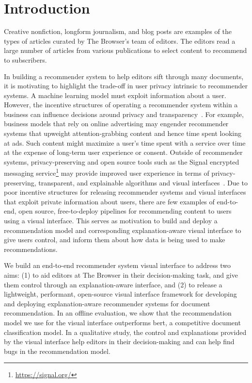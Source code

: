 \section{Introduction}
\label{sec:introduction}
Creative nonfiction, longform journalism, and blog posts are examples of the types of articles curated by The Browser's team of editors. The editors read a large number of articles from various publications to select content to recommend to subscribers.

In building a recommender system to help editors sift through many documents, it is motivating to highlight the trade-off in user privacy intrinsic to recommender systems. A machine learning model must exploit information about a user. However, the incentive structures of operating a recommender system within a business can influence decisions around privacy and transparency~\citep{diakopoulos2020oxford}. For example, business models that rely on online advertising may engender recommender systems that upweight attention-grabbing content and hence time spent looking at ads. Such content might maximize a user's time spent with a service over time at the expense of long-term user experience or consent. Outside of recommender systems, privacy-preserving and open source tools such as the Signal encrypted messaging service\footnote{\url{https://signal.org/}} may provide improved user experience in terms of privacy-preserving, transparent, and explainable algorithms and visual interfaces~\citep{cohn-gordon2017a-formal}. Due to poor incentive structures for releasing recommender systems and visual interfaces that exploit private information about users, there are few examples of end-to-end, open source, free-to-deploy pipelines for recommending content to users using a visual interface. This serves as motivation to build and deploy a recommendation model and corresponding explanation-aware visual interface to give users control, and inform them about how data is being used to make recommendations.

We build an end-to-end recommender system visual interface to address two aims: (1) to aid editors at The Browser in their decision-making task, and give them control through an explanation-aware interface, and (2) to release a lightweight, performant, open-source visual interface framework for developing and deploying explanation-aware recommender systems for document recommendation. In an offline evaluation, we show that the recommendation model we use for the visual interface outperforms \acrshort{bert}, a competitive document classification model. In a qualitative study, the control and explanations provided by the visual interface help editors in their decision-making and can help find bugs in the recommendation model.